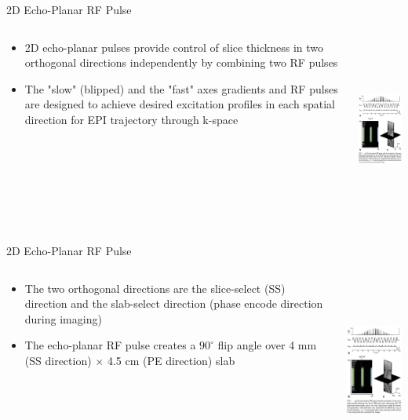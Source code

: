 \documentclass{beamer}
\begin{document}
\begin{frame}{2D Echo-Planar RF Pulse}
\begin{columns}[T]
	\begin{column}[T]{5cm}
		\begin{itemize}
			\item 2D echo-planar pulses provide control of slice thickness in two orthogonal directions independently by combining two RF pulses
			\item The "slow" (blipped) and the "fast" axes gradients and RF pulses are designed to achieve desired excitation profiles in each spatial direction for EPI trajectory through k-space
		\end{itemize}
	\end{column}
	\begin{column}[T]{5cm}
		\includegraphics[height=6cm]{SpineDWIfig1}
	\end{column}
\end{columns}
\end{frame}

\begin{frame}{2D Echo-Planar RF Pulse}
\begin{columns}[T]
	\begin{column}[T]{5cm}
		\begin{itemize}
			\item The two orthogonal directions are the slice-select (SS) direction and the slab-select direction (phase encode direction during imaging)
			\item The echo-planar RF pulse creates a $90^{\circ}$ flip angle over 4 mm (SS direction) $\times$ 4.5 cm (PE direction) slab
		\end{itemize}
	\end{column}
	\begin{column}[T]{5cm}
		\includegraphics[height=6cm]{SpineDWIfig1}
	\end{column}
\end{columns}
\end{frame}
\end{document}
